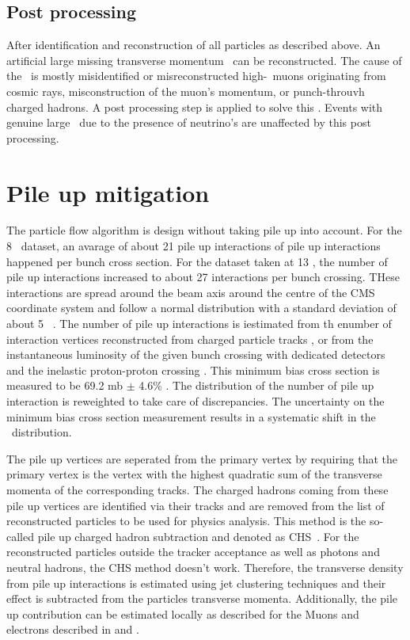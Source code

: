 \subsection{Post processing}
\label{sec:Postprocess}
After identification and reconstruction of all particles as described above. An artificial large missing transverse momentum \ptmisvec\ can be reconstructed. The cause of the \ptmisvec\ is mostly misidentified or misreconstructed high-\pt\ muons originating from cosmic rays, misconstruction of the muon's momentum, or punch-throuvh charged hadrons. A post processing step is applied to solve this \ptmisvec. Events with genuine large \ptmisvec\ due to the presence of neutrino's are unaffected by this post processing.

\newpage
\section{Pile up mitigation}
\label{sec:pileup}
The particle flow algorithm is design without taking pile up into account. For the 8 \TeV\ dataset, an avarage of about 21 pile up interactions of pile up interactions happened per bunch cross section. For the dataset taken at 13 \TeV, the number of pile up interactions increased to about 27 interactions per bunch crossing.  THese interactions are spread around the beam axis around the centre of the CMS coordinate system and follow a normal distribution with a standard deviation of about 5 \cm~\cite{CMS-PRF-14-001}.  The number of pile up interactions is iestimated from th enumber of interaction vertices reconstructed from charged particle tracks \todocite, or from the instantaneous luminosity of the given bunch crossing with dedicated detectors and the inelastic proton-proton crossing \todocite. This minimum bias cross section is measured to be 69.2 mb $\pm$ 4.6\% \cite{CMS-PAS-LUM-17-001}. The distribution of the number of pile up interaction is reweighted to take care of discrepancies. The uncertainty on the minimum bias cross section measurement results in  a systematic shift in the \pu\ distribution. 

The pile up vertices are seperated from the primary vertex by requiring that the primary vertex is the vertex with the highest quadratic sum of the transverse momenta of the corresponding tracks. The charged hadrons coming from these pile up vertices are identified via their tracks and are removed from the list of reconstructed particles to be used for physics analysis. This method is the so-called pile up charged hadron subtraction and denoted as CHS~\cite{CMS-PAS-JME-14-001}. For the reconstructed particles outside the tracker acceptance as well as photons and neutral hadrons, the CHS method doesn't work. Therefore, the transverse density from pile up interactions is estimated using jet clustering techniques \todocite and their effect is subtracted from the particles transverse momenta. Additionally, the pile up contribution can be estimated locally as described for the Muons and electrons described in  and . 




